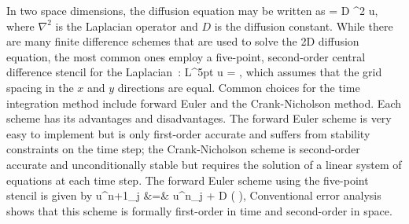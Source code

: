 \documentclass[oneeqnum,onefignum,onetabnum,onethmnum]{siamltex}
\begin{document}
In two space dimensions, the diffusion equation may be written as
\beq
   = D \nabla^2 u,
  \label{eq:diffusion_eqn_2d}
\eeq
where $\nabla^2$ is the Laplacian operator and $D$ is the diffusion constant. 
While there are many finite difference schemes that are used to solve the 
2D diffusion equation, the most common ones employ a five-point, second-order 
central difference stencil for the Laplacian~\cite{iserles_book}:
\beq
  L^{5pt} u = ,
  \label{eq:laplacian_2d_5pt_stencil}
\eeq
which assumes that the grid spacing in the $x$ and $y$ directions are
equal.  Common choices for the time integration method include forward Euler
and the Crank-Nicholson method.  Each scheme has its advantages and
disadvantages.  The forward Euler scheme is very easy to implement but is 
only first-order accurate and suffers from stability constraints on the time 
step; the Crank-Nicholson scheme is second-order accurate and unconditionally 
stable but requires the solution of a linear system of equations at each time 
step.  The forward Euler scheme using the five-point stencil is given by
\bea
  u^{n+1}_j &=& u^{n}_j 
  + D \dt 
    \left( 
    \right),
  \label{eq:diffusion_eqn_2d_5pt_scheme}
\eea
Conventional error analysis shows that this scheme is formally first-order in 
time and second-order in space.
\end{document}
